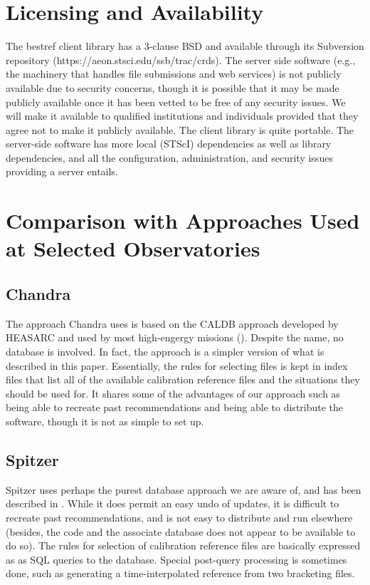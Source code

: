\documentclass[final,authoryear,5p,times,twocolumn]{elsarticle}
\begin{document}
\section{Licensing and Availability}

The bestref client library has a 3-clause BSD and available through its
Subversion repository (https://aeon.stsci.edu/ssb/trac/crds). 
The server side software (e.g., the machinery that handles
file submissions and web services) is not publicly available due to security
concerns, though it is possible that it may be made publicly available once it
has been vetted to be free of any security issues. We will make it available to
qualified institutions and individuals provided that they agree not to make it
publicly available. The client library is quite portable. The server-side
software has more local (STScI) dependencies as well as library dependencies,
and all the configuration, administration, and security issues providing a
server entails.

\section{Comparison with Approaches Used at Selected Observatories}

\subsection{Chandra}

The approach Chandra uses is based on the CALDB approach developed by 
HEASARC and used by most high-engergy missions 
(\citealt{2006SPIE.6270E..1XG}). Despite
the name, no database is involved. In fact, the approach is a simpler 
version of what is described in this paper. Essentially, the rules for 
selecting files is kept in index files that list all of the available 
calibration reference files and the situations they should be used for. 
It shares some of the advantages of our approach such as being able to 
recreate past recommendations and being able to distribute the software, 
though it is not as simple to set up. 

\subsection{Spitzer}

Spitzer uses perhaps the purest database approach we are aware of, and 
has been described in \citealt{2005ASPC..347..594L}. 
While it does permit an easy undo of updates, 
it is difficult to recreate past recommendations, and is not easy to 
distribute and run elsewhere (besides, the code and the associate 
database does not appear to be available to do so).
The rules for selection of calibration reference 
files are basically expressed as as SQL queries to the database.
Special post-query processing is sometimes done, such as generating
a time-interpolated reference from two bracketing files.
\end{document}
